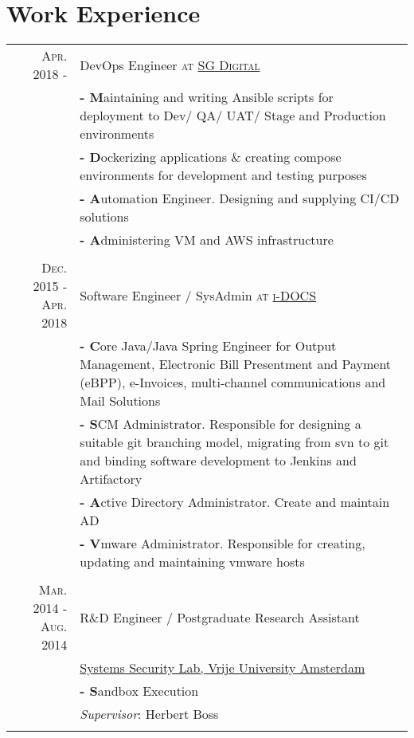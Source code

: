 \documentclass[a4paper,10pt]{article} %
\begin{document}
\section{Work Experience}
\begin{tabular}{r|p{}}

\textsc{Apr. 2018 - } & {\large DevOps Engineer \textsc{at \href{https://www.sgdigital.com/}{SG Digital}}} \\
& \textbf{- M}aintaining and writing Ansible scripts for deployment to Dev/ QA/ UAT/ Stage and Production environments \\
& \textbf{- D}ockerizing applications \& creating compose environments for development and testing purposes \\
& \textbf{- A}utomation Engineer. Designing and supplying CI/CD solutions  \\
& \textbf{- A}dministering VM and AWS infrastructure \\
\multicolumn{2}{c}{} \\

\textsc{Dec. 2015 - Apr. 2018} & {\large Software Engineer / SysAdmin \textsc{at \href{https://www.i-docs.com/}{i-DOCS}}} \\
& \textbf{- C}ore Java/Java Spring Engineer for Output Management, Electronic Bill Presentment and Payment (eBPP), e-Invoices,  multi-channel communications and Mail Solutions \\
& \textbf{- S}CM Administrator. Responsible for designing a suitable git branching model, migrating from svn to git and binding software development to Jenkins and Artifactory \\
& \textbf{- A}ctive Directory Administrator. Create and maintain AD \\
& \textbf{- V}mware Administrator. Responsible for creating, updating and maintaining vmware hosts\\
\multicolumn{2}{c}{} \\

\textsc{Mar. 2014 - Aug. 2014} & {\large R\&D Engineer / Postgraduate Research Assistant} \\
&  {\large \href{https://www.vusec.net/}{Systems Security Lab, Vrije University Amsterdam}} \\
& \textbf{- S}andbox Execution \\
& \emph{Supervisor}: Herbert Boss \\
\multicolumn{2}{c}{} \\


\end{tabular}
\end{document}
